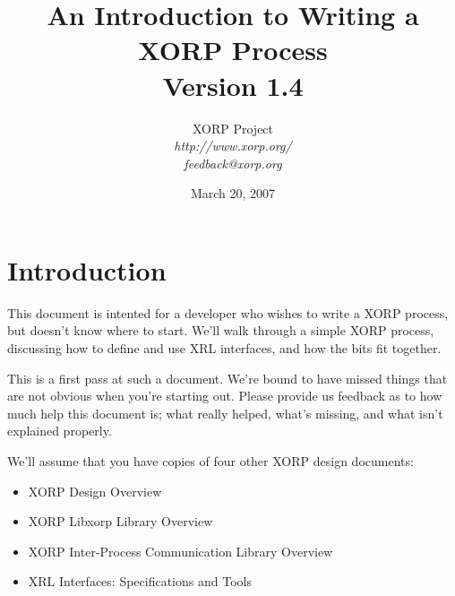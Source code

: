 \documentclass[11pt]{article}
\begin{document}
\title{An Introduction to Writing a XORP Process \\
\vspace{1ex}
Version 1.4}
\author{ XORP Project					\\
         {\it http://www.xorp.org/}			\\
	 {\it feedback@xorp.org}
}
\date{March 20, 2007}

\maketitle


%
%
\newcommand{\stt}{\tt\small}
\newcommand{\SR}{{\tt\small static\_routes}\xspace}
\newcommand{\SRI}{{\it static\_routes}\xspace}



\tableofcontents

\newpage

\section{Introduction}

This document is intented for a developer who wishes to write a XORP
process, but doesn't know where to start.  We'll walk through a simple
XORP process, discussing how to define and use XRL interfaces, and how
the bits fit together.  

This is a first pass at such a document.  We're bound to have missed
things that are not obvious when you're starting out.  Please provide
us feedback as to how much help this document is; what really helped,
what's missing, and what isn't explained properly.

We'll assume that you have copies of four other XORP design documents:

\begin{itemize}
  \item XORP Design Overview\cite{xorp:design_arch}
  \item XORP Libxorp Library Overview\cite{xorp:libxorp}
  \item XORP Inter-Process Communication Library Overview\cite{xorp:xrl}
  \item XRL Interfaces: Specifications and Tools\cite{xorp:xrl_interfaces}
\end{itemize}
\end{document}
